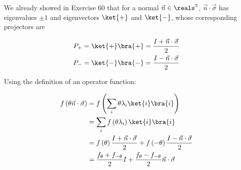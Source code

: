 We already showed in Exercise 60 that for a normal $\vec{n} \in \reals^3$,
$\vec{n} \cdot \vec{\sigma}$ has eigenvalues $\pm 1$ and eigenvectors $\ket{+}$
and $\ket{-}$, whose corresponding projectors are

\begin{align}
P_+ = \ket{+} \bra{+} &= \frac{I + \vec{n} \cdot \vec{\sigma}}{2} \\
P_- = \ket{-} \bra{-} &= \frac{I - \vec{n} \cdot \vec{\sigma}}{2}
\end{align}

Using the definition of an operator function:

\begin{align}
f \left( \theta \vec{n} \cdot \vec{\sigma} \right) &= f \left( \sum_i{\theta
\lambda_i \ket{i} \bra{i}} \right) \\
&= \sum_i{f \left( \theta \lambda_i \right) \ket{i} \bra{i}} \\
&= f \left( \theta \right) \frac{I + \vec{n} \cdot \vec{\sigma}}{2} + f \left(
-\theta \right) \frac{I - \vec{n} \cdot \vec{\sigma}}{2} \\
&= \frac{f_\theta + f_{-\theta}}{2} I + \frac{f_\theta - f_{-\theta}}{2} \vec{n}
\cdot \vec{\sigma}
\end{align}
